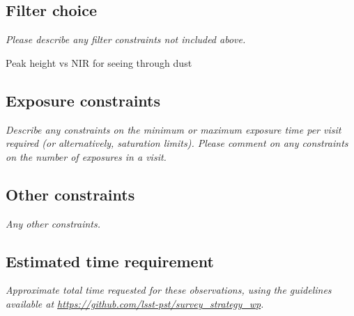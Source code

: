 \documentclass[11pt]{article}
\begin{document}
\subsection{Filter choice}
\begin{footnotesize}
{\it Please describe any filter constraints not included above.}
\end{footnotesize}

Peak height vs NIR for seeing through dust

\subsection{Exposure constraints}
\begin{footnotesize}
{\it Describe any constraints on the minimum or maximum exposure time per visit required (or alternatively, saturation limits).
Please comment on any constraints on the number of exposures in a visit.}
\end{footnotesize}

\subsection{Other constraints}
\begin{footnotesize}
{\it Any other constraints.}
\end{footnotesize}

\subsection{Estimated time requirement}
\begin{footnotesize}
{\it Approximate total time requested for these observations, using the guidelines available at \url{https://github.com/lsst-pst/survey_strategy_wp}.}
\end{footnotesize}

\vspace{.3in}
\end{document}
